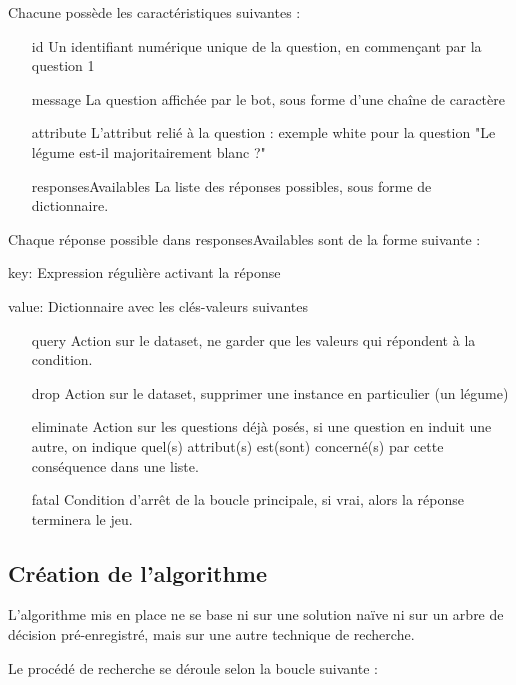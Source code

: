 \documentclass{report}
\begin{document}
Chacune possède les caractéristiques suivantes : 
\begin{enumerate}
    \item[id] Un identifiant numérique unique de la question, en commençant par la question 1
    \item[message] La question affichée par le bot, sous forme d'une chaîne de caractère
    \item[attribute] L'attribut relié à la question : exemple white pour la question "Le légume est-il majoritairement blanc ?"
    \item[responsesAvailables] La liste des réponses possibles, sous forme de dictionnaire.
\end{enumerate}

Chaque réponse possible dans responsesAvailables sont de la forme suivante :

key: Expression régulière activant la réponse

value: Dictionnaire avec les clés-valeurs suivantes
\begin{enumerate}
    \item[query] Action sur le dataset, ne garder que les valeurs qui répondent à la condition.
    \item[drop] Action sur le dataset, supprimer une instance en particulier (un légume)
    \item[eliminate] Action sur les questions déjà posés, si une question en induit une autre, on indique quel(s) attribut(s) est(sont) concerné(s) par cette conséquence dans une liste. 
    \item[fatal] Condition d'arrêt de la boucle principale, si vrai, alors la réponse terminera le jeu. 
\end{enumerate}

\subsection{Création de l'algorithme}

L'algorithme mis en place ne se base ni sur une solution naïve ni sur un arbre de décision pré-enregistré, mais sur une autre technique de recherche.

Le procédé de recherche se déroule selon la boucle suivante :
\end{document}
